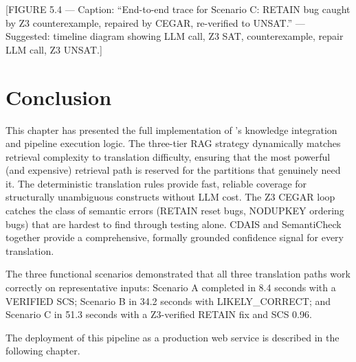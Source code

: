 [FIGURE 5.4 --- Caption: ``End-to-end trace for Scenario C: RETAIN bug caught
by Z3 counterexample, repaired by CEGAR, re-verified to UNSAT.'' ---
Suggested: timeline diagram showing LLM call, Z3 SAT, counterexample, repair
LLM call, Z3 UNSAT.]

\section{Conclusion}
\label{sec:ch5-conclusion}

This chapter has presented the full implementation of \codara{}'s knowledge
integration and pipeline execution logic. The three-tier RAG strategy
dynamically matches retrieval complexity to translation difficulty, ensuring
that the most powerful (and expensive) retrieval path is reserved for the
partitions that genuinely need it. The deterministic translation rules provide
fast, reliable coverage for structurally unambiguous constructs without LLM
cost. The Z3 CEGAR loop catches the class of semantic errors (RETAIN reset
bugs, NODUPKEY ordering bugs) that are hardest to find through testing alone.
CDAIS and SemantiCheck together provide a comprehensive, formally grounded
confidence signal for every translation.

The three functional scenarios demonstrated that all three translation paths
work correctly on representative inputs: Scenario A completed in 8.4 seconds
with a VERIFIED SCS; Scenario B in 34.2 seconds with LIKELY\_CORRECT; and
Scenario C in 51.3 seconds with a Z3-verified RETAIN fix and SCS 0.96.

The deployment of this pipeline as a production web service is described in the
following chapter.

%
